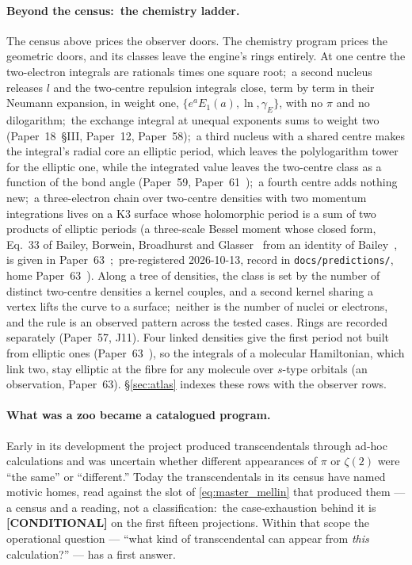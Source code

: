 \documentclass[11pt,a4paper]{article}
\newcommand{\gvc}[2]{#2}
\begin{document}
\paragraph{Beyond the census:\ the chemistry ladder.}  The census
above prices the observer doors.  The chemistry program prices the
geometric doors, and its classes leave the engine's rings
entirely.  At one centre the two-electron integrals are rationals times one square root;\ a second
nucleus releases $l$ and the two-centre repulsion integrals close, term by
term in their Neumann expansion, in weight one, $\{e^{a}E_1(a), \ln, \gamma_E\}$,
with no $\pi$ and no dilogarithm;\ the exchange integral at unequal exponents
sums to weight two (Paper~18~\S III, Paper~12, Paper~58);\ a third nucleus
with a shared centre makes the integral's radial core an elliptic period, which
leaves the polylogarithm tower for the elliptic one, while the integrated value
leaves the two-centre class as a function of the bond angle (Paper~59,
Paper~61~\cite{loutey_paper59, loutey_paper61});\ a fourth centre adds
nothing new;\ a three-electron chain over two-centre densities with two momentum
integrations lives on a K3 surface whose holomorphic period is a sum of
two products of elliptic periods (a three-scale Bessel moment whose
closed form, Eq.~33 of Bailey, Borwein, Broadhurst and
Glasser~\cite{bbbg2008} from an identity of Bailey~\cite{bailey1936}, is
given in Paper~63~\cite{loutey_paper63};\
pre-registered 2026-10-13, record in \texttt{docs/predictions/}, home
Paper~63~\cite{loutey_paper63}).  Along a tree of densities, the class is set by the number of
distinct two-centre densities a kernel couples, and a second kernel
sharing a vertex lifts the curve to a surface;\ neither is the number of
nuclei or electrons, and the rule is an observed pattern across the
tested cases.  Rings are recorded separately (Paper~57, J11).  Four linked densities give the first period not built
from elliptic ones (Paper~63~\cite{loutey_paper63}), so the integrals of
a molecular Hamiltonian, which link two, stay elliptic at the fibre for any
molecule over $s$-type orbitals (an observation, Paper~63).
\S\ref{sec:atlas} indexes these rows
with the observer rows.

\paragraph{What was a zoo became a catalogued program.}
Early in its development the project produced transcendentals through ad-hoc
calculations and was uncertain whether different appearances of $\pi$
or $\zeta(2)$ were ``the same'' or ``different.''  Today the
transcendentals in its census have named motivic homes, read against the
slot of \eqref{eq:master_mellin} that produced them --- a census and a
reading, not a classification:\ \gvc{pi-source-case-exhaustion}{the case-exhaustion behind it is
\textbf{[CONDITIONAL]} on the first fifteen projections}.  Within that scope
the operational question --- ``what kind of transcendental can appear
from \emph{this} calculation?'' --- has a first answer.
\end{document}
